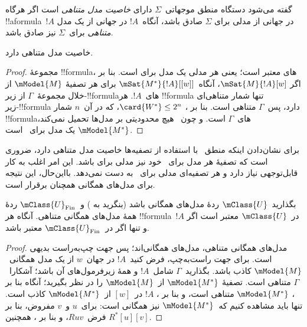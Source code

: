 \documentclass[../../../include/open-logic-section]{subfiles}
\begin{document}


\begin{defn}
  گفته می‌شود دستگاه منطق موجهاتی~$\Sigma$ دارای \emph{خاصیت مدل
    متناهی} است اگر هرگاه !!a{formula}~$!A$ در جهانی از مدلی برای
  $\Sigma$ صادق باشد، آنگاه~$!A$ در جهانی از یک مدل \emph{متناهی}
  برای~$\Sigma$ نیز صادق باشد.
\end{defn}

\begin{prop}
   خاصیت مدل متناهی دارد.
\end{prop}

\begin{proof}
   مجموعهٔ !!{formula}های معتبر است؛ یعنی هر مدلی یک مدل برای
   است. بنا بر ، اگر
  $\mSat{M}{!A}[w]$، آنگاه~$\mSat{M^*}{!A}[{[w]}]$ برای هر تصفیهٔ
  $\mModel{M}$ از خلال مجموعهٔ~$\Gamma$ از زیر-!!{formula}های~$!A$.
  هر !!{formula} تنها شمار متناهی‌ای زیر-!!{formula} دارد، پس~$\Gamma$
  متناهی است. بنا بر ،
  $\card{W^*} \le 2^n$، که در آن~$n$ شمار !!{formula}های~$\Gamma$
  است. و چون~ هیچ محدودیتی بر مدل‌ها تحمیل نمی‌کند،
  $\mModel{M^*}$ یک مدل برای~ است.
\end{proof}

برای نشان‌دادن اینکه منطق~ با استفاده از تصفیه‌ها خاصیت مدل
متناهی دارد، ضروری است که تصفیهٔ هر مدل برای~ خود نیز مدلی برای
 باشد. این امر اغلب به کار قابل‌توجهی نیاز دارد و هر تصفیه‌ای
مدلی برای~ به دست نمی‌دهد. بااین‌حال، این نتیجه برای مدل‌های
همگانی همچنان برقرار است.

\begin{prop}
  بگذارید~$\mClass{U}$ ردهٔ مدل‌های همگانی باشد (بنگرید به
  ) و~$\mClass{U}_\mathrm{Fin}$ ردهٔ همهٔ
  مدل‌های همگانی متناهی. آنگاه هر !!{formula}~$!A$ در~$\mClass{U}$
  معتبر است اگر و تنها اگر در~$\mClass{U}_\mathrm{Fin}$ معتبر باشد.
\end{prop}

\begin{proof}
  مدل‌های همگانی متناهی، مدل‌های همگانی‌اند؛ پس جهت چپ‌به‌راست بدیهی
  است. برای جهت راست‌به‌چپ، فرض کنید~$!A$ در جهان~$w$ از یک مدل
  همگانی~$\mModel{M}$ کاذب باشد. بگذارید~$\Gamma$ شامل~$!A$ و همهٔ
  زیرفرمول‌های آن باشد؛ آشکارا~$\Gamma$ متناهی است. تصفیهٔ
  $\mModel{M^*}$ از~$\mModel{M}$ را در نظر بگیرید؛ آنگاه بنا بر
  ، $\mModel{M^*}$ متناهی است، و بنا
  بر ، $!A$ در~$[w]$ از~$\mModel{M^*}$
  کاذب است. تنها باید مشاهده کنیم که~$\mModel{M^*}$ نیز همگانی است:
  برای~$u$ و~$v$ مفروض، بنا بر فرض~$Ruv$، و بنا بر
  ، همچنین
  $R^*[u][v]$.
\end{proof}
\end{document}
